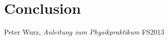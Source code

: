 \documentclass{scrreprt}
\begin{document}
\section{Conclusion}


\begin{thebibliography}{9}

  Peter Wurz,
  \emph{Anleitung zum Physikpraktikum}
  FS2013

\end{thebibliography}
\end{document}

